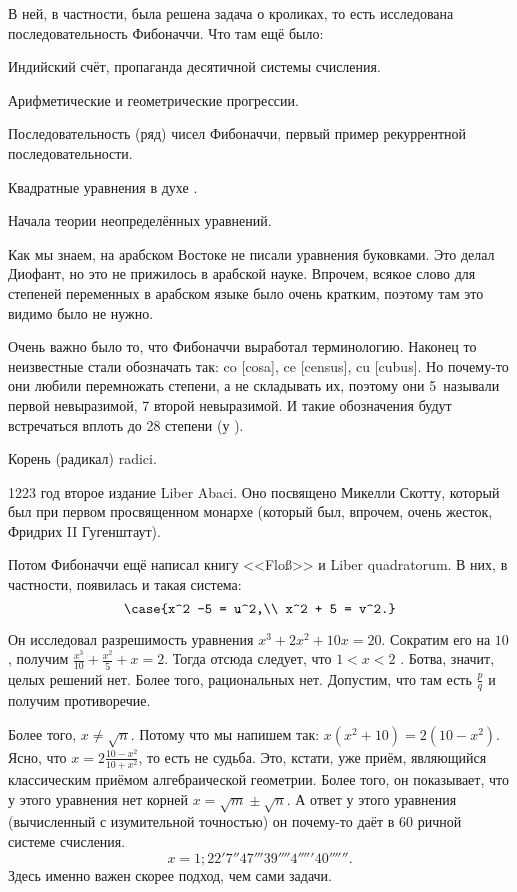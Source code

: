\documentclass[a4paper,oneside,fleqn,10pt]{article}
\begin{document}
В ней, в частности, была решена задача о кроликах, то есть исследована
последовательность Фибоначчи.  Что там ещё было:

\begin{items}{-2}
\item Индийский счёт, пропаганда десятичной системы счисления.
\item Арифметические и геометрические прогрессии.
\item Последовательность (ряд) чисел Фибоначчи, первый пример
  рекуррентной последовательности.
\item Квадратные уравнения в духе .
\item Начала теории неопределённых уравнений.
\end{items}

Как мы знаем, на арабском Востоке не писали уравнения буковками. Это
делал Диофант, но это не прижилось в арабской науке. Впрочем, всякое
слово для степеней переменных в арабском языке было очень кратким,
поэтому там это видимо было не нужно.

Очень важно было то, что Фибоначчи выработал терминологию.  Наконец то
неизвестные стали обозначать так: co [cosa], ce [census], cu [cubus].
Но почему-то они любили перемножать степени, а не складывать их,
поэтому они 5~называли первой невыразимой, 7 второй невыразимой. И
такие обозначения будут встречаться вплоть до 28 степени (у
).

Корень (радикал) radici.

1223 год второе издание Liber Abaci. Оно посвящено Микелли Скотту,
который был при первом просвященном монархе (который был, впрочем,
очень жесток, Фридрих II Гугенштаут).

Потом Фибоначчи ещё написал книгу <<Flo\ss>> и Liber quadratorum.  В
них, в частности, появилась и такая система:
$$\case{x^2 -5 = u^2,\\ x^2 + 5 = v^2.}$$

Он исследовал разрешимость уравнения $x^3 + 2x^2 + 10x = 20$.
Сократим его на $10$, получим $\frac{x^3}{10} + \frac{x^2}{5} + x =
2$.  Тогда отсюда следует, что $1 < x < 2$
. Ботва, значит, целых решений нет.  Более
того, рациональных нет. Допустим, что там есть $\frac{p}{q}$ и получим
противоречие.

Более того, $x \ne \sqrt n$. Потому что мы напишем так: $x(x^2 + 10) =
2(10-x^2)$.  Ясно, что $x = 2 \frac{10-x^2}{10+x^2}$, то есть не
судьба.  Это, кстати, уже приём, являющийся классическим приёмом
алгебраической геометрии.  Более того, он показывает, что у этого
уравнения нет корней $x = \sqrt m \pm \sqrt n$.  А ответ у этого
уравнения (вычисленный с изумительной точностью) он почему-то даёт в
$60$ ричной системе счисления.
$$x = 1;22'7''47'''39''''4'''''40''''''.$$ Здесь именно важен скорее
подход, чем сами задачи.
\end{document}
